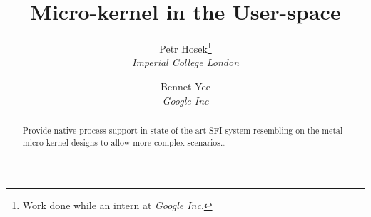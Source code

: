 \documentclass[twocolumn,10pt]{article}
\begin{document}
\title{\bf Micro-kernel in the User-space}
\author{
Petr Hosek\footnote{Work done while an intern at \textit{Google Inc}.}\\\textit{Imperial College London}
\and Bennet Yee\\\textit{Google Inc}
}
\date{}
\maketitle
\thispagestyle{empty}

\begin{abstract}
  Provide native process support in state-of-the-art SFI system
  resembling on-the-metal micro kernel designs to allow more complex
  scenarios\ldots
\end{abstract}







{
  
  
}
\end{document}
